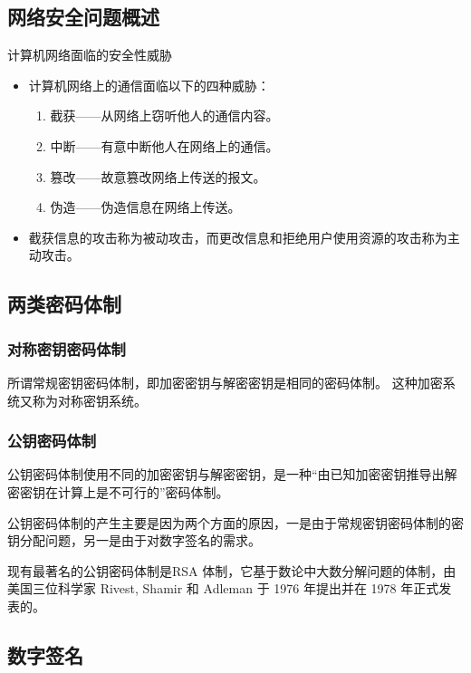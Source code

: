 \subsection{网络安全问题概述}
计算机网络面临的安全性威胁
\begin{itemize}
  \item 计算机网络上的通信面临以下的四种威胁：
  \begin{enumerate}
    \item 截获——从网络上窃听他人的通信内容。
    \item 中断——有意中断他人在网络上的通信。
    \item 篡改——故意篡改网络上传送的报文。
    \item 伪造——伪造信息在网络上传送。
  \end{enumerate}
  \item 截获信息的攻击称为被动攻击，而更改信息和拒绝用户使用资源的攻击称为主动攻击。

\end{itemize}



\subsection{两类密码体制}

\subsubsection{对称密钥密码体制}

所谓常规密钥密码体制，即加密密钥与解密密钥是相同的密码体制。
这种加密系统又称为对称密钥系统。

\subsubsection{公钥密码体制}

公钥密码体制使用不同的加密密钥与解密密钥，是一种“由已知加密密钥推导出解密密钥在计算上是不可行的”密码体制。

公钥密码体制的产生主要是因为两个方面的原因，一是由于常规密钥密码体制的密钥分配问题，另一是由于对数字签名的需求。

现有最著名的公钥密码体制是RSA 体制，它基于数论中大数分解问题的体制，由美国三位科学家 Rivest, Shamir 和 Adleman 于 1976 年提出并在 1978 年正式发表的。


\subsection{数字签名}


